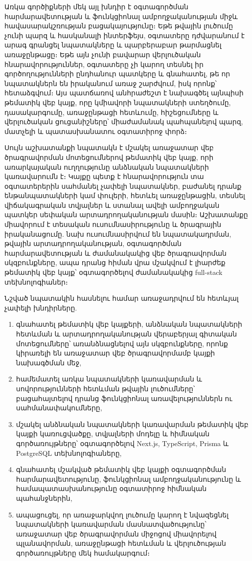 Առկա գործիքների մեկ այլ խնդիր է օգտագործման հարմարավետության և ֆունկցիոնալ ամբողջականության միջև հավասարակշռության բացակայությունը։ Եթե թվային լուծումը չունի պարզ և հասկանալի ինտերֆեյս, օգտատերը դժվարանում է արագ գրանցել նպատակները և պարբերաբար թարմացնել առաջընթացը։ Եթե այն չունի բավարար վերլուծական հնարավորություններ, օգտատերը չի կարող տեսնել իր գործողությունների ընդհանուր պատկերը և գնահատել, թե որ նպատակներն են իրականում առաջ շարժվում, իսկ որոնք՝ հետաձգվում։ Այս պատճառով անհրաժեշտ է նախագծել այնպիսի թեմատիկ վեբ կայք, որը կմիավորի նպատակների ստեղծումը, դասակարգումը, առաջընթացի հետևումը, հիշեցումները և վերլուծական ցուցանիշները՝ միաժամանակ պահպանելով պարզ, մատչելի և պատասխանատու օգտատիրոջ փորձ։

Սույն աշխատանքի նպատակն է մշակել առաջատար վեբ ծրագրավորման մոտեցումներով թեմատիկ վեբ կայք, որի առարկայական ուղղությունը անձնական նպատակների կառավարումն է։ Կայքը պետք է հնարավորություն տա օգտատերերին սահմանել չափելի նպատակներ, բաժանել դրանք ենթանպատակների կամ փուլերի, հետևել առաջընթացին, տեսնել վիճակագրական տվյալներ և ստանալ ավելի ամբողջական պատկեր սեփական արտադրողականության մասին։ Աշխատանքը միավորում է տեսական ուսումնասիրությունը և ծրագրային իրականացումը. նախ ուսումնասիրվում են նպատակադրման, թվային արտադրողականության, օգտագործման հարմարավետության և ժամանակակից վեբ ծրագրավորման սկզբունքները, ապա դրանց հիման վրա մշակվում է լիարժեք թեմատիկ վեբ կայք՝ օգտագործելով ժամանակակից full-stack տեխնոլոգիաներ։

Նշված նպատակին հասնելու համար առաջադրվում են հետևյալ չափելի խնդիրները.

\begin{enumerate}
  \item գնահատել թեմատիկ վեբ կայքերի, անձնական նպատակների հետևման և արտադրողականության վերաբերյալ գիտական մոտեցումները՝ առանձնացնելով այն սկզբունքները, որոնք կիրառելի են առաջատար վեբ ծրագրավորմամբ կայքի նախագծման մեջ,
  \item համեմատել առկա նպատակների կառավարման և սովորությունների հետևման թվային լուծումները՝ բացահայտելով դրանց ֆունկցիոնալ առավելություններն ու սահմանափակումները,
  \item մշակել անձնական նպատակների կառավարման թեմատիկ վեբ կայքի կառուցվածքը, տվյալների մոդելը և հիմնական գործառույթները՝ օգտագործելով Next.js, TypeScript, Prisma և PostgreSQL տեխնոլոգիաները,
  \item գնահատել մշակված թեմատիկ վեբ կայքի օգտագործման հարմարավետությունը, ֆունկցիոնալ ամբողջականությունը և համապատասխանությունը օգտատիրոջ հիմնական պահանջներին,
  \item ապացուցել, որ առաջարկվող լուծումը կարող է նվազեցնել նպատակների կառավարման մասնատվածությունը՝ առաջատար վեբ ծրագրավորման միջոցով միավորելով պլանավորման, առաջընթացի հետևման և վերլուծության գործառույթները մեկ համակարգում։
\end{enumerate}

